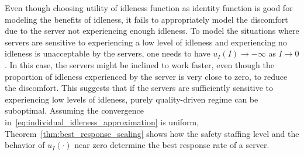 \documentclass[a4paper,11pt,twoside]{article}
\numberwithin{equation}{section}
\numberwithin{figure}{section}
\theoremstyle{plain}
\newcommand{\1}{\mathbbm{1}}
\begin{document}
Even though choosing utility of idleness function as identity function is good for modeling the benefits of idleness, it fails to appropriately model the discomfort due to the server not experiencing enough idleness. To model the situations where servers are sensitive to experiencing a low level of idleness and experiencing no idleness is unacceptable by the servers, one needs to have $u_I(I)\to-\infty$ as $I\to 0$. In this case, the servers might be inclined to work faster, even though the proportion of idleness experienced by the server is very close to zero, to reduce the discomfort. This suggests that if the servers are sufficiently sensitive to experiencing low levels of idleness, purely quality-driven regime can be suboptimal. 
Assuming the convergence in~\eqref{eq:individual_idleness_approximation} is uniform, Theorem~\ref{thm:best_response_scaling} shows how the safety staffing level and the behavior of $u_I(\cdot)$ near zero determine the best response rate of a server. 
\end{document}

